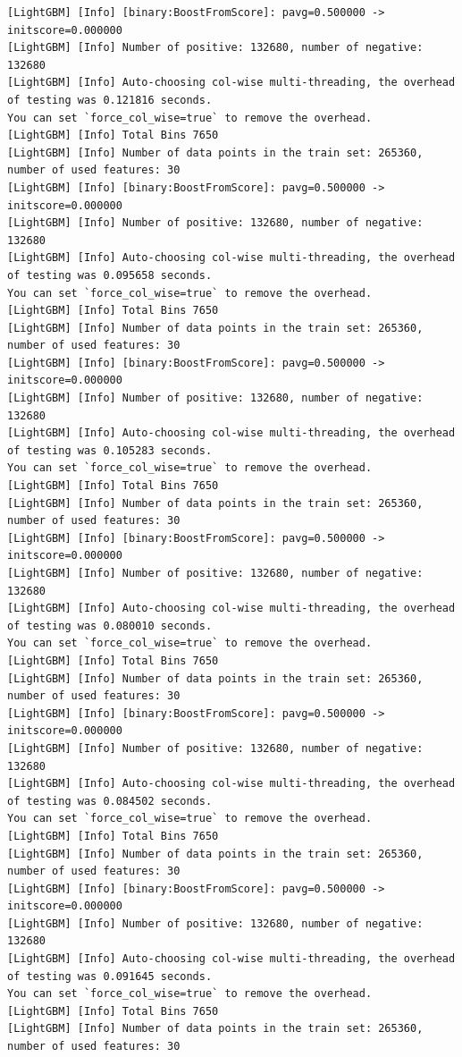 \documentclass[
  letterpaper,
  DIV=11,
  numbers=noendperiod]{scrartcl}
\begin{document}
\begin{verbatim}
[LightGBM] [Info] [binary:BoostFromScore]: pavg=0.500000 -> initscore=0.000000
[LightGBM] [Info] Number of positive: 132680, number of negative: 132680
[LightGBM] [Info] Auto-choosing col-wise multi-threading, the overhead of testing was 0.121816 seconds.
You can set `force_col_wise=true` to remove the overhead.
[LightGBM] [Info] Total Bins 7650
[LightGBM] [Info] Number of data points in the train set: 265360, number of used features: 30
[LightGBM] [Info] [binary:BoostFromScore]: pavg=0.500000 -> initscore=0.000000
[LightGBM] [Info] Number of positive: 132680, number of negative: 132680
[LightGBM] [Info] Auto-choosing col-wise multi-threading, the overhead of testing was 0.095658 seconds.
You can set `force_col_wise=true` to remove the overhead.
[LightGBM] [Info] Total Bins 7650
[LightGBM] [Info] Number of data points in the train set: 265360, number of used features: 30
[LightGBM] [Info] [binary:BoostFromScore]: pavg=0.500000 -> initscore=0.000000
[LightGBM] [Info] Number of positive: 132680, number of negative: 132680
[LightGBM] [Info] Auto-choosing col-wise multi-threading, the overhead of testing was 0.105283 seconds.
You can set `force_col_wise=true` to remove the overhead.
[LightGBM] [Info] Total Bins 7650
[LightGBM] [Info] Number of data points in the train set: 265360, number of used features: 30
[LightGBM] [Info] [binary:BoostFromScore]: pavg=0.500000 -> initscore=0.000000
[LightGBM] [Info] Number of positive: 132680, number of negative: 132680
[LightGBM] [Info] Auto-choosing col-wise multi-threading, the overhead of testing was 0.080010 seconds.
You can set `force_col_wise=true` to remove the overhead.
[LightGBM] [Info] Total Bins 7650
[LightGBM] [Info] Number of data points in the train set: 265360, number of used features: 30
[LightGBM] [Info] [binary:BoostFromScore]: pavg=0.500000 -> initscore=0.000000
[LightGBM] [Info] Number of positive: 132680, number of negative: 132680
[LightGBM] [Info] Auto-choosing col-wise multi-threading, the overhead of testing was 0.084502 seconds.
You can set `force_col_wise=true` to remove the overhead.
[LightGBM] [Info] Total Bins 7650
[LightGBM] [Info] Number of data points in the train set: 265360, number of used features: 30
[LightGBM] [Info] [binary:BoostFromScore]: pavg=0.500000 -> initscore=0.000000
[LightGBM] [Info] Number of positive: 132680, number of negative: 132680
[LightGBM] [Info] Auto-choosing col-wise multi-threading, the overhead of testing was 0.091645 seconds.
You can set `force_col_wise=true` to remove the overhead.
[LightGBM] [Info] Total Bins 7650
[LightGBM] [Info] Number of data points in the train set: 265360, number of used features: 30

\end{verbatim}
\end{document}
